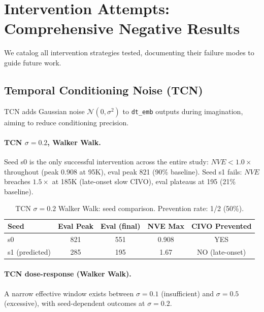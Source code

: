 \documentclass[letterpaper]{article}
\newcommand{\civo}{CIVO\xspace}
\newcommand{\nve}{NVE\xspace}
\newcommand{\dtemb}{\texttt{dt\_emb}\xspace}
\begin{document}
\appendix
\section{Intervention Attempts: Comprehensive Negative Results}
\label{app:interventions}

We catalog all intervention strategies tested, documenting their failure modes to guide future work.

\subsection{Temporal Conditioning Noise (TCN)}

TCN adds Gaussian noise $\mathcal{N}(0, \sigma^2)$ to \dtemb outputs during imagination, aiming to reduce conditioning precision.

\paragraph{TCN $\sigma = 0.2$, Walker Walk.}
Seed s0 is the only successful intervention across the entire study: $\nve < 1.0\times$ throughout (peak 0.908 at 95K), eval peak 821 (90\% baseline). Seed s1 fails: $\nve$ breaches $1.5\times$ at 185K (late-onset slow \civo), eval plateaus at 195 (21\% baseline).

\begin{table}[h]
\centering
\caption{TCN $\sigma = 0.2$ Walker Walk: seed comparison. Prevention rate: 1/2 (50\%).}
\label{tab:tcn_02_walker}
\begin{tabular}{lcccc}
\toprule
Seed & Eval Peak & Eval (final) & NVE Max & CIVO Prevented \\
\midrule
s0 & 821 & 551 & 0.908 & YES \\
s1 (predicted) & 285 & 195 & 1.67 & NO (late-onset) \\
\bottomrule
\end{tabular}
\end{table}

\paragraph{TCN dose-response (Walker Walk).}
A narrow effective window exists between $\sigma = 0.1$ (insufficient) and $\sigma = 0.5$ (excessive), with seed-dependent outcomes at $\sigma = 0.2$.
\end{document}
